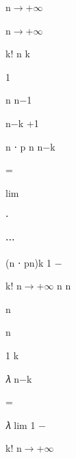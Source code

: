 \documentclass[a4paper,portrait,12pt]{article}
\begin{document}
\begin{flushleft}
n$\rightarrow$+$\infty$
\end{flushleft}


\begin{flushleft}
n$\rightarrow$+$\infty$
\end{flushleft}


\begin{flushleft}
k! n k
\end{flushleft}


1


\begin{flushleft}
n n$-$1
\end{flushleft}


\begin{flushleft}
n$-$k +1
\end{flushleft}


\begin{flushleft}
n ⋅ p n n$-$k
\end{flushleft}


=


\begin{flushleft}
lim
\end{flushleft}


⋅


⋅⋅⋅


\begin{flushleft}
(n ⋅ pn)k 1 $-$
\end{flushleft}


\begin{flushleft}
k! n$\rightarrow$+$\infty$ n n
\end{flushleft}


\begin{flushleft}
n
\end{flushleft}


\begin{flushleft}
n
\end{flushleft}


\begin{flushleft}
1 k
\end{flushleft}


\begin{flushleft}
𝜆 n$-$k
\end{flushleft}


=


\begin{flushleft}
𝜆 lim 1 $-$
\end{flushleft}


\begin{flushleft}
k! n$\rightarrow$+$\infty$
\end{flushleft}
\end{document}
